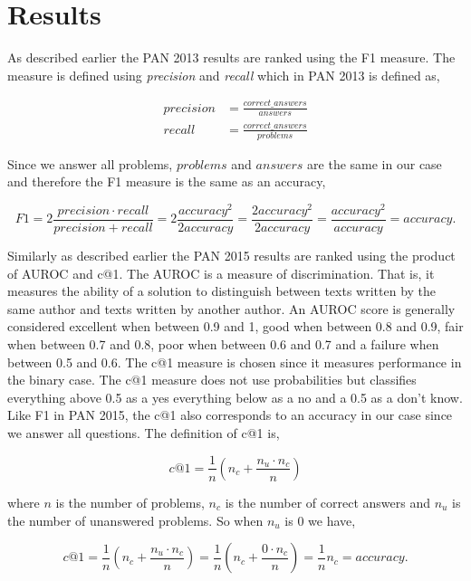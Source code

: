 \section{Results} \label{sec:results}
As described earlier the PAN 2013 results are ranked using the F1 measure. The
measure is defined using \textit{precision} and \textit{recall} which in PAN
2013 is defined as,

\begin{align}
    precision &=  \frac{correct\_answers}{answers} \\[1em]
    recall &= \frac{correct\_answers}{problems}
\end{align}

Since we answer all problems, $problems$ and $answers$ are the same in our case
and therefore the F1 measure is the same as an accuracy,

\begin{equation}
    F1 = 2 \frac{precision \cdot recall}{precision + recall}
        = 2 \frac{accuracy^2}{2accuracy}
        = \frac{2accuracy^2}{2accuracy}
        = \frac{accuracy^2}{accuracy}
        = accuracy.
\end{equation}

Similarly as described earlier the PAN 2015 results are ranked using the product
of \gls{AUROC} and c@1. The \gls{AUROC} is a measure of discrimination. That
is, it measures the ability of a solution to distinguish between texts written
by the same author and texts written by another author. An \gls{AUROC} score is
generally considered excellent when between 0.9 and 1, good when between 0.8
and 0.9, fair when between 0.7 and 0.8, poor when between 0.6 and 0.7 and a
failure when between 0.5 and 0.6. The c@1 measure is chosen since it measures
performance in the binary case. The c@1 measure does not use probabilities but
classifies everything above 0.5 as a yes everything below as a no and a 0.5 as a
don't know. Like F1 in PAN 2015, the c@1 also corresponds to an accuracy in our
case since we answer all questions. The definition of c@1 is,

\begin{equation}
    c@1 = \frac{1}{n} \left(n_c + \frac{n_u \cdot n_c}{n}\right)
\end{equation}

where $n$ is the number of problems, $n_c$ is the number of correct answers and
$n_u$ is the number of unanswered problems. So when $n_u$ is 0 we have,

\begin{equation}
    c@1 = \frac{1}{n} \left(n_c + \frac{n_u \cdot n_c}{n}\right)
        = \frac{1}{n} \left(n_c + \frac{0 \cdot n_c}{n}\right)
        = \frac{1}{n} n_c
        = accuracy.
\end{equation}

